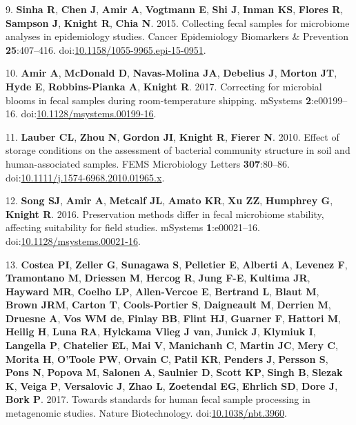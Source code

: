 \documentclass[11,]{article}
\begin{document}
9. \textbf{Sinha R}, \textbf{Chen J}, \textbf{Amir A}, \textbf{Vogtmann
E}, \textbf{Shi J}, \textbf{Inman KS}, \textbf{Flores R},
\textbf{Sampson J}, \textbf{Knight R}, \textbf{Chia N}. 2015. Collecting
fecal samples for microbiome analyses in epidemiology studies. Cancer
Epidemiology Biomarkers \& Prevention \textbf{25}:407--416.
doi:\href{http://dx.doi.org/10.1158/1055-9965.epi-15-0951}{10.1158/1055-9965.epi-15-0951}.

10. \textbf{Amir A}, \textbf{McDonald D}, \textbf{Navas-Molina JA},
\textbf{Debelius J}, \textbf{Morton JT}, \textbf{Hyde E},
\textbf{Robbins-Pianka A}, \textbf{Knight R}. 2017. Correcting for
microbial blooms in fecal samples during room-temperature shipping.
mSystems \textbf{2}:e00199--16.
doi:\href{http://dx.doi.org/10.1128/msystems.00199-16}{10.1128/msystems.00199-16}.

11. \textbf{Lauber CL}, \textbf{Zhou N}, \textbf{Gordon JI},
\textbf{Knight R}, \textbf{Fierer N}. 2010. Effect of storage conditions
on the assessment of bacterial community structure in soil and
human-associated samples. FEMS Microbiology Letters \textbf{307}:80--86.
doi:\href{http://dx.doi.org/10.1111/j.1574-6968.2010.01965.x}{10.1111/j.1574-6968.2010.01965.x}.

12. \textbf{Song SJ}, \textbf{Amir A}, \textbf{Metcalf JL},
\textbf{Amato KR}, \textbf{Xu ZZ}, \textbf{Humphrey G}, \textbf{Knight
R}. 2016. Preservation methods differ in fecal microbiome stability,
affecting suitability for field studies. mSystems \textbf{1}:e00021--16.
doi:\href{http://dx.doi.org/10.1128/msystems.00021-16}{10.1128/msystems.00021-16}.

13. \textbf{Costea PI}, \textbf{Zeller G}, \textbf{Sunagawa S},
\textbf{Pelletier E}, \textbf{Alberti A}, \textbf{Levenez F},
\textbf{Tramontano M}, \textbf{Driessen M}, \textbf{Hercog R},
\textbf{Jung F-E}, \textbf{Kultima JR}, \textbf{Hayward MR},
\textbf{Coelho LP}, \textbf{Allen-Vercoe E}, \textbf{Bertrand L},
\textbf{Blaut M}, \textbf{Brown JRM}, \textbf{Carton T},
\textbf{Cools-Portier S}, \textbf{Daigneault M}, \textbf{Derrien M},
\textbf{Druesne A}, \textbf{Vos WM de}, \textbf{Finlay BB},
\textbf{Flint HJ}, \textbf{Guarner F}, \textbf{Hattori M},
\textbf{Heilig H}, \textbf{Luna RA}, \textbf{Hylckama Vlieg J van},
\textbf{Junick J}, \textbf{Klymiuk I}, \textbf{Langella P},
\textbf{Chatelier EL}, \textbf{Mai V}, \textbf{Manichanh C},
\textbf{Martin JC}, \textbf{Mery C}, \textbf{Morita H}, \textbf{O'Toole
PW}, \textbf{Orvain C}, \textbf{Patil KR}, \textbf{Penders J},
\textbf{Persson S}, \textbf{Pons N}, \textbf{Popova M}, \textbf{Salonen
A}, \textbf{Saulnier D}, \textbf{Scott KP}, \textbf{Singh B},
\textbf{Slezak K}, \textbf{Veiga P}, \textbf{Versalovic J}, \textbf{Zhao
L}, \textbf{Zoetendal EG}, \textbf{Ehrlich SD}, \textbf{Dore J},
\textbf{Bork P}. 2017. Towards standards for human fecal sample
processing in metagenomic studies. Nature Biotechnology.
doi:\href{http://dx.doi.org/10.1038/nbt.3960}{10.1038/nbt.3960}.
\end{document}
